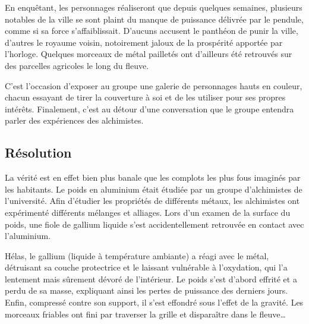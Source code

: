 En enquêtant, les personnages réaliseront que depuis quelques semaines, plusieurs notables de la ville se sont plaint du manque de puissance délivrée par le pendule, comme si sa force s'affaiblissait.
D'aucuns accusent le panthéon de punir la ville, d'autres le royaume voisin, notoirement jaloux de la prospérité apportée par l'horloge.
Quelques morceaux de métal pailletés ont d'ailleurs été retrouvés sur des parcelles agricoles le long du fleuve.

C'est l'occasion d'exposer au groupe une galerie de personnages hauts en couleur, chacun essayant de tirer la couverture à soi et de les utiliser pour ses propres intérêts.
Finalement, c'est au détour d'une conversation que le groupe entendra parler des expériences des alchimistes.

\subsection{Résolution}

La vérité est en effet bien plus banale que les complots les plus fous imaginés par les habitants.
Le poids en aluminium était étudiée par un groupe d'alchimistes de l'université.
Afin d'étudier les propriétés de différents métaux, les alchimistes ont expérimenté différents mélanges et alliages.
Lors d'un examen de la surface du poids, une fiole de gallium liquide s'est accidentellement retrouvée en contact avec l'aluminium.

Hélas, le gallium (liquide à température ambiante) a réagi avec le métal, détruisant sa couche protectrice et le laissant vulnérable à l'oxydation, qui l'a lentement mais sûrement dévoré de l'intérieur.
Le poids s'est d'abord effrité et a perdu de sa masse, expliquant ainsi les pertes de puissance des derniers jours.
Enfin, compressé contre son support, il s'est effondré sous l'effet de la gravité.
Les morceaux friables ont fini par traverser la grille et disparaître dans le fleuve\dots

\vfill
{}
\vfill
